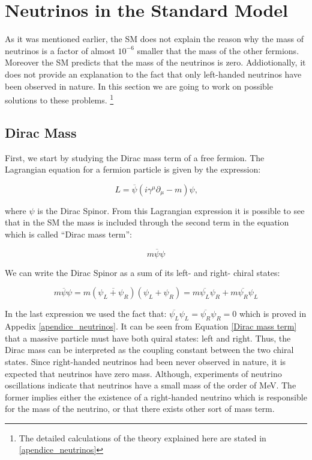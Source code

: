 \section{Neutrinos in the Standard Model}

As it was mentioned earlier, the SM does not explain the reason why the mass of neutrinos is a factor of almost $10^{-6}$ smaller that the mass of the other fermions. Moreover the SM predicts that
the mass of the neutrinos is zero. Addiotionally, it does not provide an explanation to the fact that only left-handed neutrinos have been observed in nature. 
In this section we are going to work on possible solutions to these problems. \footnote{The detailed calculations of the theory explained here are stated in \ref{apendice_neutrinos}}

\subsection{Dirac Mass}

First, we start by studying the Dirac mass term of a free fermion. The Lagrangian equation for a fermion particle is given by the expression:

\begin{equation}
 L = \overline{\psi} \left( i \gamma ^\mu \partial_{\mu} - m \right) \psi \text{,}
\end{equation}

where $\psi$ is the Dirac Spinor. From this Lagrangian expression it is possible to see that in the SM the mass is included through the second term in the equation which is called ``Dirac mass term'':

\begin{equation}
 m \overline{\psi} \psi
\end{equation}

We can write the Dirac Spinor as a sum of its left- and right- chiral states:

\begin{equation}\label{Dirac mass term}
 m \overline{\psi} \psi = m \left( \overbar{\psi_L + \psi_R} \right) \left( \psi_L + \psi_R \right) = m \overline{\psi_L} \psi_R + m \overline{\psi_R}\psi_L
\end{equation} 

In the last expression we used the fact that: $\overline{\psi_L}\psi_L = \overline{\psi_R}\psi_R = 0$ which is proved in Appedix \ref{apendice_neutrinos}. It can be seen from Equation \ref{Dirac mass term} that a massive particle must have both quiral states: left and right. Thus, the Dirac mass can be interpreted as the coupling constant between the two chiral states. Since right-handed 
neutrinos had been never observed in nature, it is expected that neutrinos have zero mass. Although, experiments of neutrino oscillations indicate that neutrinos have a small mass of 
the order of MeV. The former implies either the existence of a right-handed neutrino which is responsible for the mass of the neutrino, or that there exists other sort of mass term.

